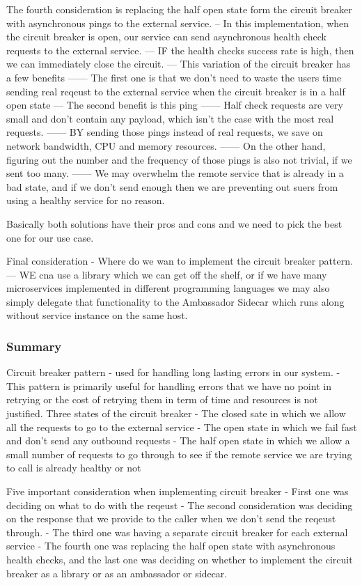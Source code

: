 The fourth consideration is replacing the half open state form the circuit breaker with asynchronous pings to the external service.
-- In this implementation, when the circuit breaker is open, our service can send asynchronous health check requests to the external service.
--- IF the health checks success rate is high, then we can immediately close the circuit.
--- This variation of the circuit breaker has a few benefits
------ The first one is that we don't need to waste the users time sending real reqeust to the external service when the circuit breaker is in a half open state
--- The second benefit is this ping
------ Half check requests are very small and don't contain any payload, which isn't the case with the most real requests.
------ BY sending those pings instead of real requests, we save on network bandwidth, CPU and memory resources.
------ On the other hand, figuring out the number and the frequency of those pings is also not trivial, if we sent too many.
------ We may overwhelm the remote service that is already in a bad state, and if we don't send enough then we are preventing out suers from using a healthy service for no reason.

Basically both solutions have their pros and cons and we need to pick the best one for our use case.

Final consideration - Where do we wan to implement the circuit breaker pattern.
--- WE cna use a library which we can get off the shelf, or if we have many microservices implemented in different programming languages we may also simply delegate that functionality to the Ambassador Sidecar which runs along without service instance on the same host.

\subsubsection{Summary}
Circuit breaker pattern - used for handling long lasting errors in our system.
- This pattern is primarily useful for handling errors that we have no point in retrying or the cost of retrying them in term of time and resources is not justified.
Three states of the circuit breaker
- The closed sate in which we allow all the requests to go to the external service
- The open state in which we fail fast and don't send any outbound requests
- The half open state in which we allow a small number of requests to go through to see if the remote service we are trying to call is already healthy or not

Five important consideration when implementing circuit breaker
- First one was deciding on what to do with the reqeust
- The second consideration was deciding on the response that we provide to the caller when we don't send the reqeust through.
- The third one was having a separate circuit breaker for each external service
- The fourth one was replacing the half open state with asynchronous health checks, and the last one was deciding on whether to implement the circuit breaker as a library or as an ambassador or sidecar.

